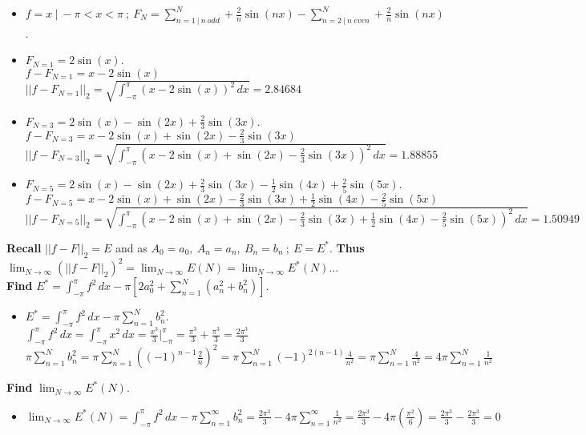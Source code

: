 \documentclass[10pt]{article}
\begin{document}
\begin{itemize} 
    \item $ \displaystyle f = x \ | \ -\pi < x < \pi \ ; \ F_N = \sum_{n = 1 \ | \ n \ odd}^N + \frac{2}{n} \sin(nx) - \sum_{n = 2 \ | \ n \ even}^N + \frac{2}{n} \sin(nx) $. \\
    \item $ \displaystyle F_{N = 1} = 2 \sin(x) $. \\
    \subitem $ \displaystyle f - F_{N = 1}  = x - 2 \sin(x) $
    \subitem $ \displaystyle ||f-F_{N = 1}||_2  = \sqrt{\int_{-\pi }^{\pi } (x - 2 \sin(x))^2 \, dx} = 2.84684$
    \item $ \displaystyle F_{N = 3} = 2 \sin(x) - \sin(2x) + \frac{2}{3} \sin(3x) $. \\
    \subitem $ \displaystyle f - F_{N = 3}  = x - 2 \sin(x) + \sin(2x) - \frac{2}{3} \sin(3x) $
    \subitem $ \displaystyle ||f-F_{N = 3}||_2  = \sqrt{\int_{-\pi }^{\pi } (x - 2 \sin(x) + \sin(2x) - \frac{2}{3} \sin(3x))^2 \, dx} = 1.88855 $
    \item $ \displaystyle F_{N = 5} = 2 \sin(x) - \sin(2x) + \frac{2}{3} \sin(3x) - \frac{1}{2} \sin(4x) + \frac{2}{5} \sin(5x) $. \\
    \subitem $ \displaystyle f - F_{N = 5}  = x - 2 \sin(x) + \sin(2x) - \frac{2}{3} \sin(3x) + \frac{1}{2} \sin(4x) - \frac{2}{5} \sin(5x) $
    \subitem $ \displaystyle ||f-F_{N = 5}||_2  = \sqrt{\int_{-\pi }^{\pi } (x - 2 \sin(x) + \sin(2x) - \frac{2}{3} \sin(3x) + \frac{1}{2} \sin(4x) - \frac{2}{5} \sin(5x))^2 \, dx} = 1.50949 $
\end{itemize}

\noindent
\textbf{Recall} $ \displaystyle ||f-F||_2 = E $ and as $ A_0 = a_0, \ A_n = a_n, \ B_n = b_n \ ; \ E = E^* $. \textbf{Thus} $ \displaystyle \lim_{N\to\infty}(||f-F||_2)^2 = \lim_{N\to\infty}E(N) = \lim_{N\to\infty}E^*(N) \dots $ \\

\noindent
\textbf{Find} $ \displaystyle E^* = \int_{-\pi }^{\pi } f^2 \, dx - \pi [2 a^2_0 + \sum_{n = 1}^{N} (a^2_n + b^2_n)] $. \\
\begin{itemize} 
    \item $ \displaystyle E^* = \int_{-\pi }^{\pi } f^2 \, dx - \pi \sum_{n = 1}^{N} b^2_n $. \\
    \subitem $ \displaystyle \int_{-\pi }^{\pi } f^2 \, dx = \int_{-\pi }^{\pi } x^2 \, dx = \frac{x^3}{3} \Big|_{-\pi}^{\pi} = \frac{\pi^3}{3} + \frac{\pi^3}{3} = \frac{2\pi^3}{3} $
    \subitem $ \displaystyle \pi \sum_{n = 1}^{N} b^2_n = \pi \sum_{n = 1}^{N} ((-1)^{n - 1} \frac{2}{n})^2 = \pi \sum_{n = 1}^{N} (-1)^{2(n-1)} \frac{4}{n^2} = \pi \sum_{n = 1}^{N} \frac{4}{n^2} = 4\pi \sum_{n = 1}^{N} \frac{1}{n^2} $
\end{itemize}

\noindent
\textbf{Find} $ \lim_{N\to\infty}E^*(N) $.
\begin{itemize} 
    \item $ \displaystyle \lim_{N\to\infty}E^*(N) = \int_{-\pi }^{\pi } f^2 \, dx - \pi \sum_{n = 1}^{\infty} b^2_n = \frac{2 \pi^3}{3} - 4\pi \sum_{n = 1}^{\infty} \frac{1}{n^2} = \frac{2 \pi^3}{3} - 4\pi (\frac{\pi^2}{6}) = \frac{2 \pi^3}{3} - \frac{2 \pi^3}{3} = 0 $
\end{itemize}
\end{document}
